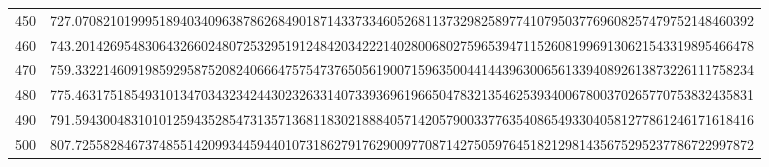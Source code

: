 \documentclass[final]{article}
\begin{document}
\begin{table}
\begin{center}
\begin{tabular}{|c|c|}
			450 &  727.0708210199951894034096387862684901871433733460526811373298258977410795037769608257479752148460392 \\
			460 &  743.2014269548306432660248072532951912484203422214028006802759653947115260819969130621543319895466478 \\ 
			470 &  759.3322146091985929587520824066647575473765056190071596350044144396300656133940892613873226111758234 \\
			480 &  775.4631751854931013470343234244302326331407339369619665047832135462539340067800370265770753832435831 \\
			490 &  791.5943004831010125943528547313571368118302188840571420579003377635408654933040581277861246171618416 \\
			500 &  807.7255828467374855142099344594401073186279176290097708714275059764518212981435675295237786722997872 \\
			\hline
			\hline
		\end{tabular}
	\end{center}
	\bigskip\bigskip
\end{table}
\end{document}
